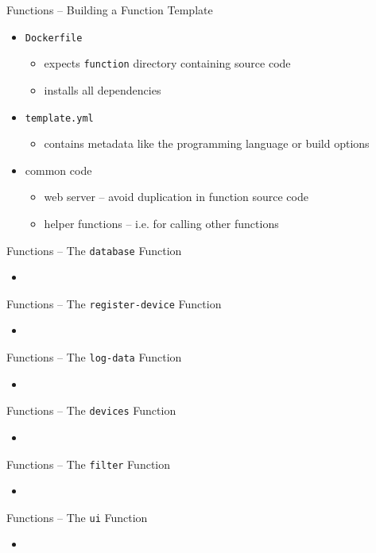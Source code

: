 \begin{frame}{Functions -- Building a Function Template}
  \begin{itemize}
    \item \texttt{Dockerfile}
      \begin{itemize}
        \item expects \texttt{function} directory containing source code
        \item installs all dependencies
      \end{itemize}
    \item \texttt{template.yml}
      \begin{itemize}
        \item contains metadata like the programming language or build options
      \end{itemize}
    \item common code
      \begin{itemize}
        \item web server -- avoid duplication in function source code
        \item helper functions -- i.e. for calling other functions
      \end{itemize}
  \end{itemize}
\end{frame}

\begin{frame}{Functions -- The \texttt{database} Function}
  \begin{itemize}
    \item
  \end{itemize}
\end{frame}

\begin{frame}{Functions -- The \texttt{register-device} Function}
  \begin{itemize}
    \item
  \end{itemize}
\end{frame}

\begin{frame}{Functions -- The \texttt{log-data} Function}
  \begin{itemize}
    \item
  \end{itemize}
\end{frame}

\begin{frame}{Functions -- The \texttt{devices} Function}
  \begin{itemize}
    \item
  \end{itemize}
\end{frame}

\begin{frame}{Functions -- The \texttt{filter} Function}
  \begin{itemize}
    \item
  \end{itemize}
\end{frame}

\begin{frame}{Functions -- The \texttt{ui} Function}
  \begin{itemize}
    \item
  \end{itemize}
\end{frame}
